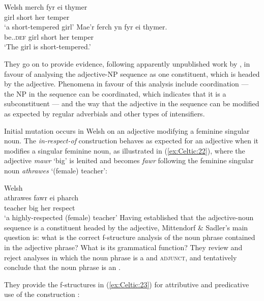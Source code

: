 \documentclass[output=paper,colorlinks,citecolor=brown]{langscibook}
\begin{document}
\ea\label{ex:Celtic:21} Welsh \citep[9]{MittSadl08}
\ea
\gll merch fyr ei thymer\\
girl  short her temper\\
\glt`a short-tempered girl'
\ex
\gll Mae'r ferch  yn fyr ei thymer.\\
{be.\PRS.\textsc{def}} girl  {\PRED} short her temper\\
\glt`The girl is short-tempered.'
\z\z

\begin{sloppypar}
\noindent
They go on to provide evidence, following apparently unpublished work by \citet{Jones2002}, in favour of analysing the adjective-NP sequence as one constituent, which is headed by the adjective. Phenomena in favour of this analysis include coordination --- the NP in the sequence can be coordinated, which indicates that it is a subconstituent \citep[3]{MittSadl08} --- and the way that the adjective in the sequence can be modified as expected by regular adverbials and other types of intensifiers.
\end{sloppypar}

Initial mutation occurs in Welsh on an adjective modifying a feminine singular noun. The \emph{in-respect-of} construction behaves as expected for an adjective when it modifies a singular feminine noun, as illustrated in (\ref{ex:Celtic:22}), where the adjective \emph{mawr} `big' is lenited and becomes \emph{fawr} following the feminine singular noun \emph{athrawes} `(female) teacher':

\ea\label{ex:Celtic:22} Welsh \citep[6]{MittSadl08}\\
\gll athrawes fawr ei pharch\\
teacher big her respect\\
\glt`a highly-respected (female) teacher'
\z
Having established that the adjective-noun sequence is a constituent headed by the adjective, Mittendorf \& Sadler's main question is: what is the correct f-structure analysis of the noun phrase contained in the adjective phrase? What is its grammatical function? They review and reject analyses in which the noun phrase is a \SUBJ and \textsc{adjunct}, and tentatively conclude that the noun phrase is an \OBJ.

They provide the f-structures in (\ref{ex:Celtic:23}) for attributive and predicative use of the construction \citep[12]{MittSadl08}:
\end{document}
